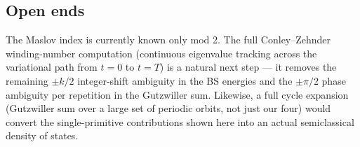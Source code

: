 \subsection{Open ends}

The Maslov index is currently known only mod 2. The full Conley--Zehnder
winding-number computation (continuous eigenvalue tracking across the
variational path from $t = 0$ to $t = T$) is a natural next step --- it
removes the remaining $\pm k/2$ integer-shift ambiguity in the BS energies
and the $\pm \pi/2$ phase ambiguity per repetition in the Gutzwiller sum.
Likewise, a full cycle expansion (Gutzwiller sum over a large set of
periodic orbits, not just our four) would convert the single-primitive
contributions shown here into an actual semiclassical density of states.
